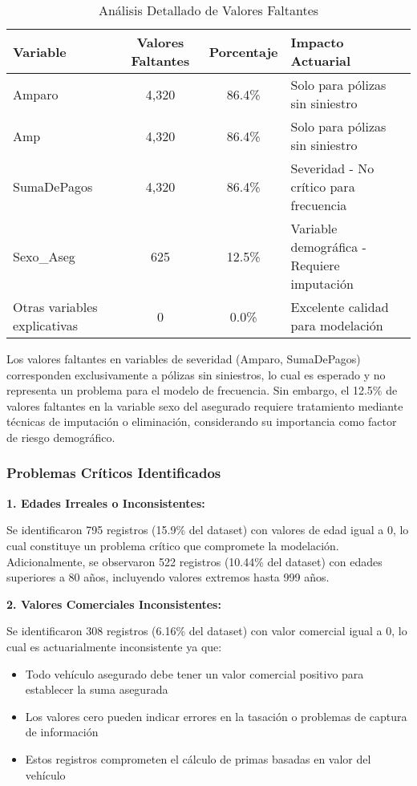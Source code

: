\begin{table}[H]
\centering
\caption{Análisis Detallado de Valores Faltantes}
\begin{tabular}{|l|c|c|l|}
\hline
\textbf{Variable} & \textbf{Valores Faltantes} & \textbf{Porcentaje} & \textbf{Impacto Actuarial} \\
\hline
Amparo & 4,320 & 86.4\% & Solo para pólizas sin siniestro \\
Amp & 4,320 & 86.4\% & Solo para pólizas sin siniestro \\
SumaDePagos & 4,320 & 86.4\% & Severidad - No crítico para frecuencia \\
Sexo\_Aseg & 625 & 12.5\% & Variable demográfica - Requiere imputación \\
Otras variables explicativas & 0 & 0.0\% & Excelente calidad para modelación \\
\hline
\end{tabular}
\end{table}

Los valores faltantes en variables de severidad (Amparo, SumaDePagos) corresponden exclusivamente a pólizas sin siniestros, lo cual es esperado y no representa un problema para el modelo de frecuencia. Sin embargo, el 12.5\% de valores faltantes en la variable sexo del asegurado requiere tratamiento mediante técnicas de imputación o eliminación, considerando su importancia como factor de riesgo demográfico.

\subsubsection{Problemas Críticos Identificados}

\textbf{1. Edades Irreales o Inconsistentes:}

Se identificaron 795 registros (15.9\% del dataset) con valores de edad igual a 0, lo cual constituye un problema crítico que compromete la modelación.
Adicionalmente, se observaron 522 registros (10.44\% del dataset) con edades superiores a 80 años, incluyendo valores extremos hasta 999 años.

\textbf{2. Valores Comerciales Inconsistentes:}

Se identificaron 308 registros (6.16\% del dataset) con valor comercial igual a 0, lo cual es actuarialmente inconsistente ya que:
\begin{itemize}
\item Todo vehículo asegurado debe tener un valor comercial positivo para establecer la suma asegurada
\item Los valores cero pueden indicar errores en la tasación o problemas de captura de información
\item Estos registros comprometen el cálculo de primas basadas en valor del vehículo
\end{itemize}

